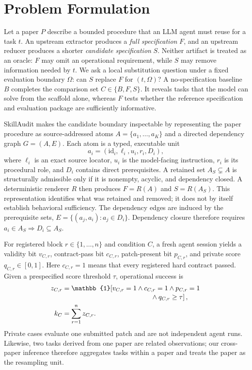 \section{Problem Formulation}

Let a paper $P$ describe a bounded procedure that an LLM agent must reuse for a task $t$. An upstream extractor produces a \emph{full specification} $F$, and an upstream reducer produces a shorter \emph{candidate specification} $S$. Neither artifact is treated as an oracle: $F$ may omit an operational requirement, while $S$ may remove information needed by $t$. We ask a local substitution question under a fixed evaluation boundary $\Omega$: can $S$ replace $F$ for $(t,\Omega)$? A no-specification baseline $B$ completes the comparison set $C\in\{B,F,S\}$. It reveals tasks that the model can solve from the scaffold alone, whereas $F$ tests whether the reference specification and evaluation package are sufficiently informative.

SkillAudit makes the candidate boundary inspectable by representing the paper procedure as source-addressed atoms $A=\{a_1,\ldots,a_K\}$ and a directed dependency graph $G=(A,E)$. Each atom is a typed, executable unit
\begin{equation}
a_i=(\mathrm{id}_i,\ell_i,u_i,r_i,D_i),
\label{eq:atom}
\end{equation}
where $\ell_i$ is an exact source locator, $u_i$ is the model-facing instruction, $r_i$ is its procedural role, and $D_i$ contains direct prerequisites. A retained set $A_S\subsetneq A$ is structurally admissible only if it is nonempty, acyclic, and dependency closed. A deterministic renderer $R$ then produces $F=R(A)$ and $S=R(A_S)$. This representation identifies what was retained and removed; it does not by itself establish behavioral sufficiency.
The dependency edges are induced by the prerequisite sets, $E=\{(a_j,a_i):a_j\in D_i\}$. Dependency closure therefore requires $a_i\in A_S\Rightarrow D_i\subseteq A_S$.

For registered block $r\in\{1,\ldots,n\}$ and condition $C$, a fresh agent session yields a validity bit $v_{C,r}$, contract-pass bit $c_{C,r}$, patch-present bit $p_{C,r}$, and private score $q_{C,r}\in[0,1]$. Here $c_{C,r}=1$ means that every registered hard contract passed. Given a prespecified score threshold $\tau$, operational success is
\begin{equation}
\begin{aligned}
z_{C,r}&=\mathbb{1}\!\left[v_{C,r}=1\land c_{C,r}=1\land p_{C,r}=1\right.\\[-2pt]
&\hspace{45mm}\left.{}\land q_{C,r}\ge\tau\right],\\
k_C&=\sum_{r=1}^{n}z_{C,r}.
\end{aligned}
\label{eq:success}
\end{equation}
Private cases evaluate one submitted patch and are not independent agent runs. Likewise, two tasks derived from one paper are related observations; our cross-paper inference therefore aggregates tasks within a paper and treats the paper as the resampling unit.

